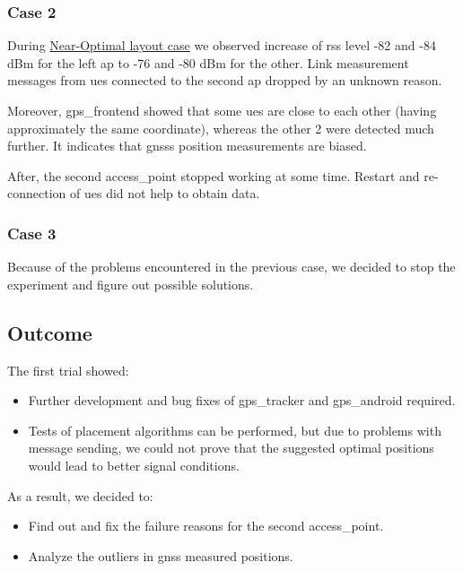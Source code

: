 \subsubsection{Case 2}

During \hyperref[near-optimal-layout]{Near-Optimal layout case} we observed increase of \acrshort{rss} level -82 and -84 dBm for the left \gls{ap} to -76 and -80 dBm for the other. Link measurement messages from \glspl{ue} connected to the second \gls{ap} dropped by an unknown reason.

Moreover, \gls{gps_frontend} showed that some \glspl{ue} are close to each other (having approximately the same coordinate), whereas the other 2 were detected much further. It indicates that \glspl{gnss} position measurements are biased.

After, the second \gls{access_point} stopped working at some time. Restart and re-connection of \glspl{ue} did not help to obtain data.


\subsubsection{Case 3}

Because of the problems encountered in the previous case, we decided to stop the experiment and figure out possible solutions.

\subsection{Outcome}

The first trial showed:

\begin{itemize}
	\tightlist
	\item
	Further development and bug fixes of \gls{gps_tracker}  and  \gls{gps_android} required.
	\item
	Tests of placement algorithms can be performed, but due to problems with message sending, we could not prove that the suggested optimal positions would lead to better signal conditions.
\end{itemize}

As a result, we decided to:

\begin{itemize}
	\tightlist
	\item
	Find out and fix the failure reasons for the second \gls{access_point}.
	\item
	Analyze the outliers in \gls{gnss} measured positions.
\end{itemize}
